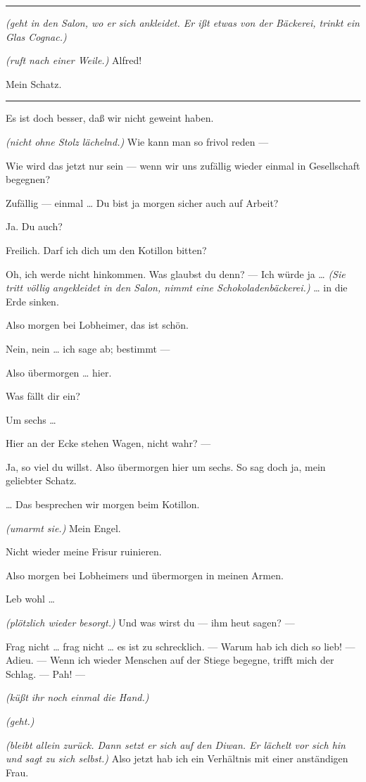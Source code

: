 \documentclass[
	final,
	a4paper,
	ngerman,
	mpinclude = true, %
	twoside = true,
	open = right,
	cleardoublepage = plain,
	DIV = 13,
	BCOR = 1cm,
	titlepage = firstiscover,
	]{scrbook}
\newcommand{\direction}[1]{\textit{(#1)}}
\newenvironment{deletion}{%
		\vspace{0.25\baselineskip}
		\hrule
		\vspace{0.25\baselineskip}
		\color{darkgray}
	}{
		\color{black}
		\vspace{0.25\baselineskip}
		\hrule 
		\vspace{0.25\baselineskip}
	}
\newcommand{\thecharacter}[1]{\textup{\textsc{#1}}\xspace}
\newcommand{\theherr}{\thecharacter{Junger Herr}}
\newcommand{\thefrau}{\thecharacter{Junge Frau}}
\newcommand{\character}[1]{\item[#1:]}
\newcommand{\herr}{\character{\theherr}}
\newcommand{\frau}{\character{\thefrau}}
\begin{document}
\begin{play}
\begin{deletion}
	\herr
	\direction{geht in den Salon, wo er sich ankleidet. Er ißt etwas von der Bäckerei, trinkt ein Glas Cognac.}

	\frau
	\direction{ruft nach einer Weile.} Alfred!

	\herr
	Mein Schatz.

	\end{deletion}
	\frau
	Es ist doch besser, daß wir nicht geweint haben.

	\herr
	\direction{nicht ohne Stolz lächelnd.} Wie kann man so frivol reden ---

	\frau
	Wie wird das jetzt nur sein --- wenn wir uns zufällig wieder einmal in Gesellschaft begegnen?

	\herr
	Zufällig --- einmal \ldots{} Du bist ja morgen sicher auch auf Arbeit?

	\frau
	Ja. Du auch?

	\herr
	Freilich. Darf ich dich um den Kotillon bitten?

	\frau
	Oh, ich werde nicht hinkommen. Was glaubst du denn? --- Ich würde ja \ldots{} \direction{Sie tritt völlig angekleidet in den Salon, nimmt eine Schokoladenbäckerei.} \ldots{} in die Erde sinken.

	\herr
	Also morgen bei Lobheimer, das ist schön.

	\frau
	Nein, nein \ldots{} ich sage ab; bestimmt ---

	\herr
	Also übermorgen \ldots{} hier.

	\frau
	Was fällt dir ein?

	\herr
	Um sechs \ldots{}

	\frau
	Hier an der Ecke stehen Wagen, nicht wahr? ---

	\herr
	Ja, so viel du willst. Also übermorgen hier um sechs. So sag doch ja, mein geliebter Schatz.

	\frau
	\ldots{} Das besprechen wir morgen beim Kotillon.

	\herr
	\direction{umarmt sie.} Mein Engel.

	\frau
	Nicht wieder meine Frisur ruinieren.

	\herr
	Also morgen bei Lobheimers und übermorgen in meinen Armen.

	\frau
	Leb wohl \ldots{}

	\herr
	\direction{plötzlich wieder besorgt.} Und was wirst du --- ihm heut sagen? ---

	\frau
	Frag nicht \ldots{} frag nicht \ldots{} es ist zu schrecklich. --- Warum hab ich dich so lieb! --- Adieu. --- Wenn ich wieder Menschen auf der Stiege begegne, trifft mich der Schlag. --- Pah! ---

	\herr
	\direction{küßt ihr noch einmal die Hand.}

	\frau
	\direction{geht.}

	\herr
	\direction{bleibt allein zurück. Dann setzt er sich auf den Diwan. Er lächelt vor sich hin und sagt zu sich selbst.} Also jetzt hab ich ein Verhältnis mit einer anständigen Frau.

\end{play}
\end{document}
